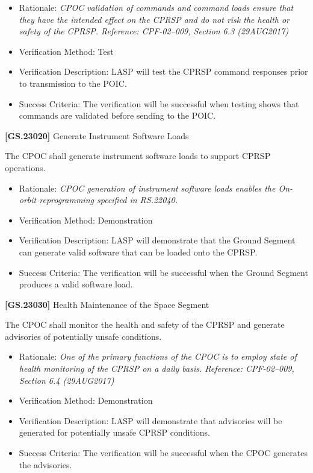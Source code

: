 \begin{itemize}
\item{} Rationale: \emph{CPOC validation of commands and command loads ensure that they have the intended effect on the CPRSP and do not risk the health or safety of the CPRSP. Reference: CPF-02--009, Section 6.3 (29AUG2017)}

\item{} Verification Method: Test

\item{} Verification Description: \gls{LASP} will \gls{test} the \gls{CPRSP} command responses prior to transmission to the \gls{POIC}.

\item{} Success Criteria: The verification will be successful when \gls{test}ing shows that commands are validated before sending to the \gls{POIC}.

\end{itemize}

\textbf{[GS.23020]} Generate Instrument Software Loads

The \gls{CPOC} shall generate instrument software loads to support \gls{CPRSP} operations.

\begin{itemize}
\item{} Rationale: \emph{CPOC generation of instrument software loads enables the On-orbit reprogramming specified in RS.22040.}

\item{} Verification Method: Demonstration

\item{} Verification Description: \gls{LASP} will demonstrate that the Ground Segment can generate valid software that can be loaded onto the \gls{CPRSP}.

\item{} Success Criteria: The verification will be successful when the Ground Segment produces a valid software load.

\end{itemize}

\textbf{[GS.23030]} Health Maintenance of the Space Segment

The \gls{CPOC} shall monitor the health and safety of the \gls{CPRSP} and generate advisories of potentially unsafe conditions.

\begin{itemize}
\item{} Rationale: \emph{One of the primary functions of the CPOC is to employ state of health monitoring of the CPRSP on a daily basis. Reference: CPF-02--009, Section 6.4 (29AUG2017)}

\item{} Verification Method: Demonstration

\item{} Verification Description: \gls{LASP} will demonstrate that advisories will be generated for potentially unsafe \gls{CPRSP} conditions.

\item{} Success Criteria: The verification will be successful when the \gls{CPOC} generates the advisories.

\end{itemize}

